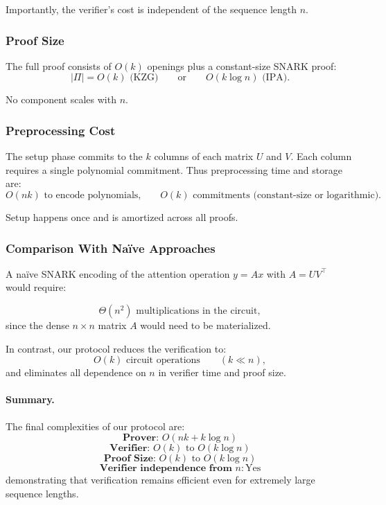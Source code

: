 \documentclass[11pt]{article}
\begin{document}
Importantly, the verifier’s cost is independent of the sequence length
$n$.

\subsubsection{Proof Size}

The full proof consists of $O(k)$ openings plus a constant-size SNARK
proof:
\[
  |\Pi| 
  = 
  O(k) \text{ (KZG)} 
  \qquad\text{or}\qquad 
  O(k \log n) \text{ (IPA)}.
\]

No component scales with $n$.

\subsubsection{Preprocessing Cost}

The setup phase commits to the $k$ columns of each matrix $U$ and $V$.
Each column requires a single polynomial commitment.
Thus preprocessing time and storage are:
\[
  O(nk) \text{ to encode polynomials,}
  \qquad 
  O(k) \text{ commitments (constant-size or logarithmic).}
\]

Setup happens once and is amortized across all proofs.

\subsubsection{Comparison With Naïve Approaches}

A naïve SNARK encoding of the attention operation $y = A x$ with
$A = U V^\top$ would require:

\[
  \Theta(n^2) \text{ multiplications in the circuit},
\]
since the dense $n \times n$ matrix $A$ would need to be materialized.

In contrast, our protocol reduces the verification to:
\[
  O(k) \text{ circuit operations} \qquad (k \ll n),
\]
and eliminates all dependence on $n$ in verifier time and proof size.

\paragraph{Summary.}
The final complexities of our protocol are:
\[
  \textbf{Prover: } O(nk + k \log n)
\]
\[
  \textbf{Verifier: } O(k) \text{ to } O(k \log n)
\]
\[
  \textbf{Proof Size: } O(k) \text{ to } O(k \log n)
\]
\[
  \textbf{Verifier independence from } n: \text{Yes}
\]
demonstrating that verification remains efficient even for extremely
large sequence lengths.
\end{document}
